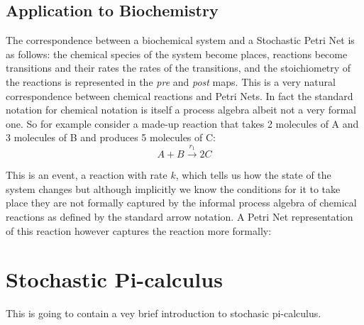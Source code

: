 \subsection{Application to Biochemistry}
The correspondence between a biochemical system and a Stochastic Petri Net is as follows: the chemical species of the system become places, reactions become transitions and their rates the rates of the transitions, and the stoichiometry of the reactions is represented in the \textit{pre} and \textit{post} maps. This is a very natural correspondence between chemical reactions and Petri Nets. In fact the standard notation for chemical notation is itself a process algebra albeit not a very formal one. So for example consider a made-up reaction that takes 2 molecules of A and 3 molecules of B and produces 5 molecules of C:
\begin{equation*}
A + B \overset{r_1}{\longrightarrow} 2C
\end{equation*}

This is an event, a reaction with rate $k$, which tells us how the state of the system changes but although implicitly we know the conditions for it to take place they are not formally captured by the informal process algebra of chemical reactions as defined by the standard arrow notation. A Petri Net representation of this reaction however captures the reaction more formally:


\section{Stochastic Pi-calculus}
This is going to contain a vey brief introduction to stochasic pi-calculus.